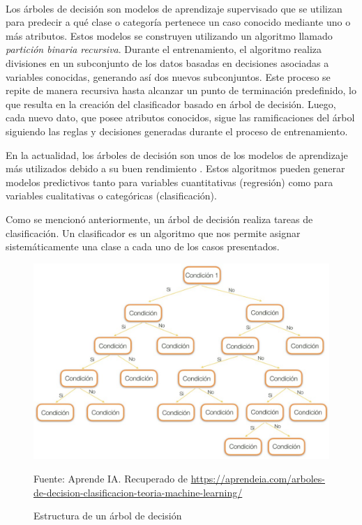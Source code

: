 \\
Los árboles de decisión son modelos de aprendizaje supervisado que se utilizan para predecir a qué clase o categoría pertenece un caso conocido mediante uno o más atributos. Estos modelos se construyen utilizando un algoritmo llamado \emph{partición binaria recursiva}. Durante el entrenamiento, el algoritmo realiza divisiones en un subconjunto de los datos basadas en decisiones asociadas a variables conocidas, generando así dos nuevos subconjuntos. Este proceso se repite de manera recursiva hasta alcanzar un punto de terminación predefinido, lo que resulta en la creación del clasificador basado en árbol de decisión. Luego, cada nuevo dato, que posee atributos conocidos, sigue las ramificaciones del árbol siguiendo las reglas y decisiones generadas durante el proceso de entrenamiento.

En la actualidad, los árboles de decisión son unos de los modelos de aprendizaje más utilizados debido a su buen rendimiento \cite{arboles-decision}. Estos algoritmos pueden generar modelos predictivos tanto para variables cuantitativas (regresión) como para variables cualitativas o categóricas (clasificación).

Como se mencionó anteriormente, un árbol de decisión realiza tareas de clasificación. Un clasificador es un algoritmo que nos permite asignar sistemáticamente una clase a cada uno de los casos presentados.

\begin{figure}[H]
    \begin{minipage}[t]{0.9\textwidth}
        \caption{Estructura de un árbol de decisión}
        \label{arbol-de-decision}        
    \end{minipage}

    \vspace{10pt}

    \begin{minipage}[b]{1.1\textwidth}
        \centering
        \includegraphics[width=\textwidth]{img/estructura-arbol-de-decision.jpg}        
    \end{minipage}

    \begin{minipage}[t]{0.9\textwidth}
        Fuente: Aprende IA. Recuperado de \url{https://aprendeia.com/arboles-de-decision-clasificacion-teoria-machine-learning/}
    \end{minipage}
\end{figure}

